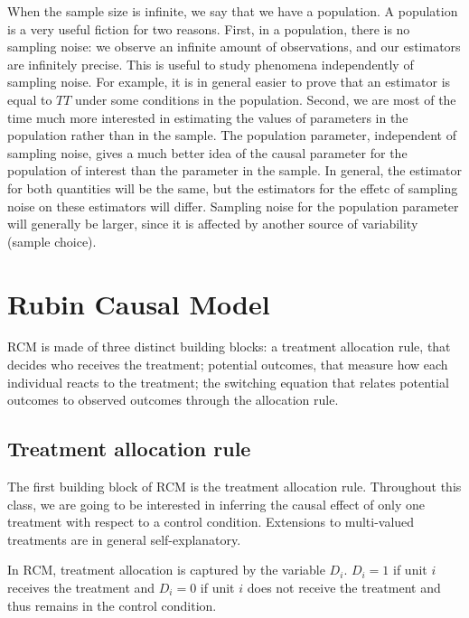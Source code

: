 \documentclass[]{book}
\theoremstyle{definition}
\theoremstyle{definition}
\theoremstyle{definition}
\theoremstyle{remark}
\begin{document}
When the sample size is infinite, we say that we have a population.
A population is a very useful fiction for two reasons.
First, in a population, there is no sampling noise: we observe an infinite amount of observations, and our estimators are infinitely precise.
This is useful to study phenomena independently of sampling noise.
For example, it is in general easier to prove that an estimator is equal to \(TT\) under some conditions in the population.
Second, we are most of the time much more interested in estimating the values of parameters in the population rather than in the sample.
The population parameter, independent of sampling noise, gives a much better idea of the causal parameter for the population of interest than the parameter in the sample.
In general, the estimator for both quantities will be the same, but the estimators for the effetc of sampling noise on these estimators will differ.
Sampling noise for the population parameter will generally be larger, since it is affected by another source of variability (sample choice).

\hypertarget{rubin-causal-model}{%
\section{Rubin Causal Model}\label{rubin-causal-model}}

RCM is made of three distinct building blocks: a treatment allocation rule, that decides who receives the treatment; potential outcomes, that measure how each individual reacts to the treatment; the switching equation that relates potential outcomes to observed outcomes through the allocation rule.

\hypertarget{treatment-allocation-rule}{%
\subsection{Treatment allocation rule}\label{treatment-allocation-rule}}

The first building block of RCM is the treatment allocation rule.
Throughout this class, we are going to be interested in inferring the causal effect of only one treatment with respect to a control condition.
Extensions to multi-valued treatments are in general self-explanatory.

In RCM, treatment allocation is captured by the variable \(D_i\).
\(D_i=1\) if unit \(i\) receives the treatment and \(D_i=0\) if unit \(i\) does not receive the treatment and thus remains in the control condition.
\end{document}

